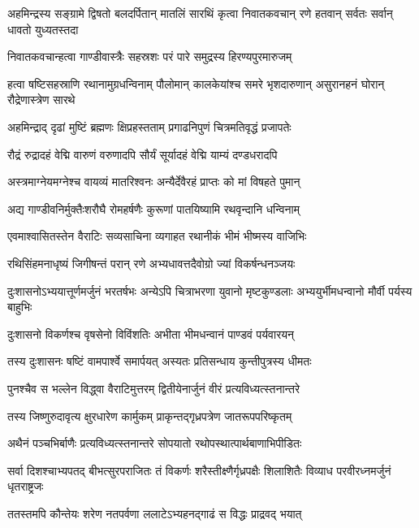 \threelineshloka
{अहमिन्द्रस्य सङ्ग्रामे द्विषतो बलदर्पितान्}
{मातलिं सारथिं कृत्वा निवातकवचान् रणे}
{हतवान् सर्वतः सर्वान् धावतो युध्यतस्तदा}


\twolineshloka
{निवातकवचान्हत्वा गाण्डीवास्त्रैः सहस्रशः}
{परं पारे समुद्रस्य हिरण्यपुरमारुजम्}


\threelineshloka
{हत्वा षष्टिसहस्राणि रथानामुग्रधन्विनाम्}
{पौलोमान् कालकेयांश्च समरे भृशदारुणान्}
{असुरानहनं घोरान् रौद्रेणास्त्रेण सारथे}


\twolineshloka
{अहमिन्द्राद् दृढां मुष्टिं ब्रह्मणः क्षिप्रहस्तताम्}
{प्रगाढनिपुणं चित्रमतिवृद्धं प्रजापतेः}


\twolineshloka
{रौद्रं रुद्रादहं वेद्मि वारुणं वरुणादपि}
{सौर्यं सूर्यादहं वेद्मि याम्यं दण्डधरादपि}


\twolineshloka
{अस्त्रमाग्नेयमग्नेश्च वायव्यं मातरिश्वनः}
{अन्यैर्देवैरहं प्राप्तः को मां विषहते पुमान्}


\twolineshloka
{अद्य गाण्डीवनिर्मुक्तैःशरौघै रोमहर्षणैः}
{कुरूणां पातयिष्यामि रथवृन्दानि धन्विनाम्}



\twolineshloka
{एवमाश्वासितस्तेन वैराटिः सव्यसाचिना}
{व्यगाहत रथानीकं भीमं भीष्मस्य वाजिभिः}


\twolineshloka
{रथिसिंहमनाधृष्यं जिगीषन्तं परान् रणे}
{अभ्यधावत्तदैवोग्रो ज्यां विकर्षन्धनञ्जयः}


\onelineshloka
{दुःशासनोऽभ्ययात्तूर्णमर्जुनं भरतर्षभः}
\twolineshloka
{अन्येऽपि चित्राभरणा युवानो मृष्टकुण्डलाः}
{अभ्ययुर्भीमधन्वानो मौर्वी पर्यस्य बाहुभिः}


\twolineshloka
{दुःशासनो विकर्णश्च वृषसेनो विविंशतिः}
{अभीता भीमधन्वानं पाण्डवं पर्यवारयन्}


\twolineshloka
{तस्य दुःशासनः षष्टिं वामपार्श्वे समार्पयत्}
{अस्यतः प्रतिसन्धाय कुन्तीपुत्रस्य धीमतः}


\twolineshloka
{पुनश्चैव स भल्लेन विद्ध्वा वैराटिमुत्तरम्}
{द्वितीयेनार्जुनं वीरं प्रत्यविध्यत्स्तनान्तरे}


\twolineshloka
{तस्य जिष्णुरुदावृत्य क्षुरधारेण कार्मुकम्}
{प्राकृन्तद्गृध्रपत्रेण जातरूपपरिष्कृतम्}


\twolineshloka
{अथैनं पञ्चभिर्बाणैः प्रत्यविध्यत्स्तनान्तरे}
{सोपयातो रथोपस्थात्पार्थबाणाभिपीडितः}


\threelineshloka
{सर्वा दिशश्चाभ्यपतद् बीभत्सुरपराजितः}
{तं विकर्णः शरैस्तीक्ष्णैर्गृध्रपक्षैः शिलाशितैः}
{विव्याध परवीरध्नमर्जुनं धृतराष्ट्रजः}


\twolineshloka
{ततस्तमपि कौन्तेयः शरेण नतपर्वणा}
{ललाटेऽभ्यहनद्गाढं स विद्धः प्राद्रवद् भयात्}


